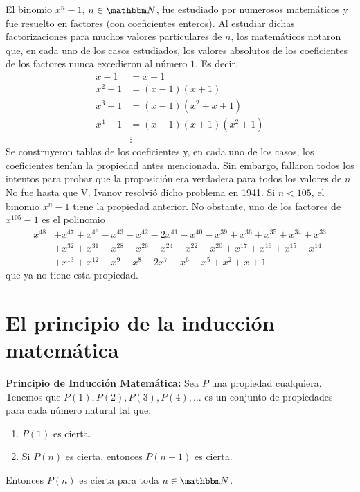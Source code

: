 \begin{example}
    El binomio $x^n-1$, $n \in \NN$, fue estudiado por numerosos matemáticos y fue resuelto en factores (con coeficientes enteros). Al estudiar dichas factorizaciones para muchos valores particulares de $n$, los matemáticos notaron que, en cada uno de los casos estudiados, los valores absolutos de los coeficientes de los factores nunca excedieron al número $1$. Es decir,
    \begin{align*}
        x-1 &=x-1 \\
        x^2-1 &=(x-1)(x+1) \\
        x^3-1 &=(x-1)\left( x^2+x+1 \right) \\
        x^4-1 &=(x-1)(x+1)\left(x^2+1\right) \\
        &\vdots 
    \end{align*}
    Se construyeron tablas de los coeficientes y, en cada uno de los casos, los coeficientes tenían la propiedad antes mencionada. Sin embargo, fallaron todos los intentos para probar que la proposición era verdadera para todos los valores de $n$. No fue hasta que V. Ivanov resolvió dicho problema en 1941. Si $n<105$, el binomio $x^n-1$ tiene la propiedad anterior. No obstante, uno de los factores de $x^{105}-1$ es el polinomio
    \begin{align*}
        x^{48} & +x^{47}+x^{46}-x^{43}-x^{42}-2x^{41}-x^{40}-x^{39}+x^{36}+x^{35}+x^{34}+x^{33} \\
        &+x^{32}+x^{31}-x^{28}-x^{26}-x^{24}-x^{22}-x^{20}+x^{17}+x^{16}+x^{15}+x^{14} \\
        &+x^{13}+x^{12}-x^9-x^8-2x^7-x^6-x^5+x^2+x+1
    \end{align*}
    que ya no tiene esta propiedad.
\end{example}

\section{El principio de la inducción matemática}

\noindent\textbf{Principio de Inducción Matemática:} Sea $P$ una propiedad cualquiera. Tenemos que $P(1), P(2), P(3), P(4), \dots$ es un conjunto de propiedades para cada número natural tal que:
\begin{enumerate}[label=\roman*.]
    \item $P(1)$ es cierta.
    \item Si $P(n)$ es cierta, entonces $P(n+1)$ es cierta.
\end{enumerate}
Entonces $P(n)$ es cierta para toda $n \in \NN$.

